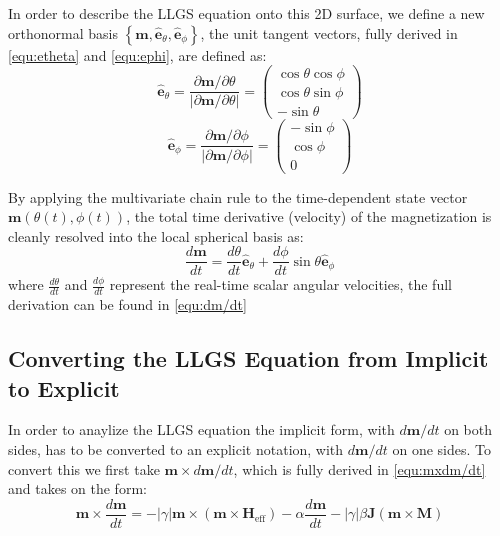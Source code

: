 \documentclass[reprint,amsmath,amssymb,aps, floatfix]{revtex4-2}
\begin{document}
In order to describe the LLGS equation onto this 2D surface, we define a new orthonormal basis $\left\{\mathbf{m}, \hat{\mathbf{e}}_{\theta}, \hat{\mathbf{e}}_{\phi}\right\}$, the unit tangent vectors, fully derived in \autoref{equ:etheta} and \autoref{equ:ephi}, are defined as:
\begin{equation}
\hat{\mathbf{e}}_{\theta} = \frac{\partial \mathbf{m} / \partial \theta}{|\partial \mathbf{m} / \partial \theta|} = \begin{pmatrix} \cos\theta\cos\phi \\ \cos\theta\sin\phi \\ -\sin\theta \end{pmatrix}
\end{equation}
\begin{equation}
\hat{\mathbf{e}}_{\phi} = \frac{\partial \mathbf{m} / \partial \phi}{|\partial \mathbf{m} / \partial \phi|} = \begin{pmatrix} -\sin\phi \\ \cos\phi \\ 0 \end{pmatrix}
\end{equation}

By applying the multivariate chain rule to the time-dependent state vector $\mathbf{m}(\theta(t), \phi(t))$, the total time derivative (velocity) of the magnetization is cleanly resolved into the local spherical basis as:
\begin{equation}
\frac{d\mathbf{m}}{dt} = \frac{d\theta}{dt}\hat{\mathbf{e}}_{\theta} + \frac{d\phi}{dt}\sin\theta\hat{\mathbf{e}}_{\phi}
\label{equ:angular_form}
\end{equation}
where $\frac{d\theta}{dt}$ and $\frac{d\phi}{dt}$ represent the real-time scalar angular velocities, the full derivation can be found in \autoref{equ:dm/dt}

\subsection{Converting the LLGS Equation from Implicit to Explicit}
In order to anaylize the LLGS equation the implicit form, with $d\mathbf{m}/dt$ on both sides, has to be converted to an explicit notation, with $d\mathbf{m}/dt$ on one sides.
To convert this we first take $\mathbf{m}\times d\mathbf{m}/dt$, which is fully derived in \autoref{equ:mxdm/dt} and takes on the form:
\begin{equation}
   \mathbf{m}\times \frac{d\mathbf{m}}{dt}=-\left|\gamma\right|\mathbf{m}\times\left(\mathbf{m}\times\mathbf{H}_{\text{eff}}\right)-\alpha\frac{d\mathbf{m}}{dt} - \left|\gamma\right|\beta\mathbf{J}\left(\mathbf{m}\times\mathbf{M}\right)
\end{equation}
\end{document}
